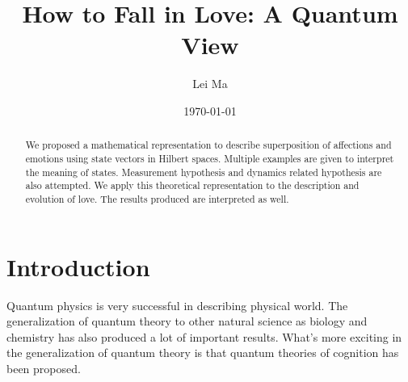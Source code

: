 \documentclass[%
 aip,
 jmp,%
 amsmath,amssymb,
 reprint,%
]{revtex4-1}
\begin{document}

\title{How to Fall in Love: A Quantum View}%


\author{Lei Ma}%
%

\date{\today}%

\begin{abstract}
We proposed a mathematical representation to describe superposition of affections and emotions using state vectors in Hilbert spaces. Multiple examples are given to interpret the meaning of states. Measurement hypothesis and dynamics related hypothesis are also attempted. We apply this theoretical representation to the description and evolution of love. The results produced are interpreted as well.
\end{abstract}

\maketitle




\newcommand{\ud}[1]{{#1^{\dagger}}}
\newcommand{\bra}[1]{\left\langle #1\right|}
\newcommand{\ket}[1]{\left| #1\right\rangle}
\newcommand\Tr{\mathrm{Tr}}
\newcommand{\braket}[2]{\langle #1 \mid #2 \rangle}
\newcommand\I{\mathbb{I}}
\newcommand{\avg}[1]{\left< #1 \right>}


\newtheorem{guess}{Hypothesis}
\newtheorem{define}{Definition}


\section{Introduction}


Quantum physics is very successful in describing physical world. The generalization of quantum theory to other natural science as biology and chemistry has also produced a lot of important results. What's more exciting in the generalization of quantum theory is that quantum theories of cognition has been proposed. \cite{quantumCognition}
\end{document}
